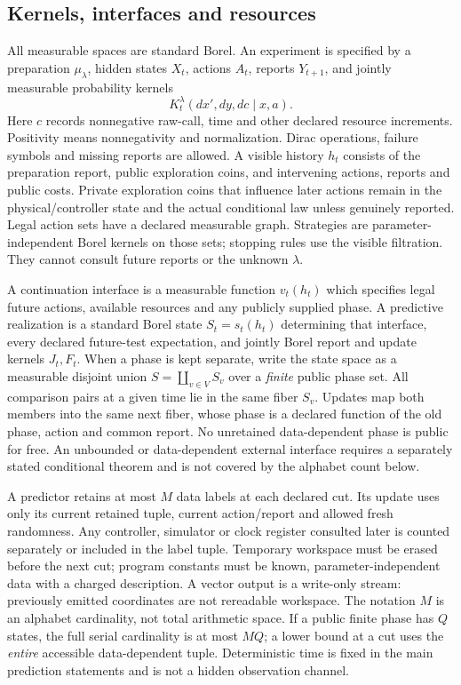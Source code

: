 \subsection{Kernels, interfaces and resources}
All measurable spaces are standard Borel. An experiment is specified by a preparation $\mu_\lambda$, hidden states $X_t$, actions $A_t$, reports $Y_{t+1}$, and jointly measurable probability kernels
\begin{equation}\label{eq:kernel}
 K_t^\lambda(dx',dy,dc\mid x,a).
\end{equation}
Here $c$ records nonnegative raw-call, time and other declared resource increments. Positivity means nonnegativity and normalization. Dirac operations, failure symbols and missing reports are allowed. A visible history $h_t$ consists of the preparation report, public exploration coins, and intervening actions, reports and public costs. Private exploration coins that influence later actions remain in the physical/controller state and the actual conditional law unless genuinely reported. Legal action sets have a declared measurable graph. Strategies are parameter-independent Borel kernels on those sets; stopping rules use the visible filtration. They cannot consult future reports or the unknown $\lambda$.

A continuation interface is a measurable function $v_t(h_t)$ which specifies legal future actions, available resources and any publicly supplied phase. A predictive realization is a standard Borel state $S_t=s_t(h_t)$ determining that interface, every declared future-test expectation, and jointly Borel report and update kernels $J_t,F_t$. When a phase is kept separate, write the state space as a measurable disjoint union $S=\coprod_{v\in V}S_v$ over a \emph{finite} public phase set. All comparison pairs at a given time lie in the same fiber $S_v$. Updates map both members into the same next fiber, whose phase is a declared function of the old phase, action and common report. No unretained data-dependent phase is public for free. An unbounded or data-dependent external interface requires a separately stated conditional theorem and is not covered by the alphabet count below.

A predictor retains at most $M$ data labels at each declared cut. Its update uses only its current retained tuple, current action/report and allowed fresh randomness. Any controller, simulator or clock register consulted later is counted separately or included in the label tuple. Temporary workspace must be erased before the next cut; program constants must be known, parameter-independent data with a charged description. A vector output is a write-only stream: previously emitted coordinates are not rereadable workspace. The notation $M$ is an alphabet cardinality, not total arithmetic space. If a public finite phase has $Q$ states, the full serial cardinality is at most $MQ$; a lower bound at a cut uses the \emph{entire} accessible data-dependent tuple. Deterministic time is fixed in the main prediction statements and is not a hidden observation channel.

